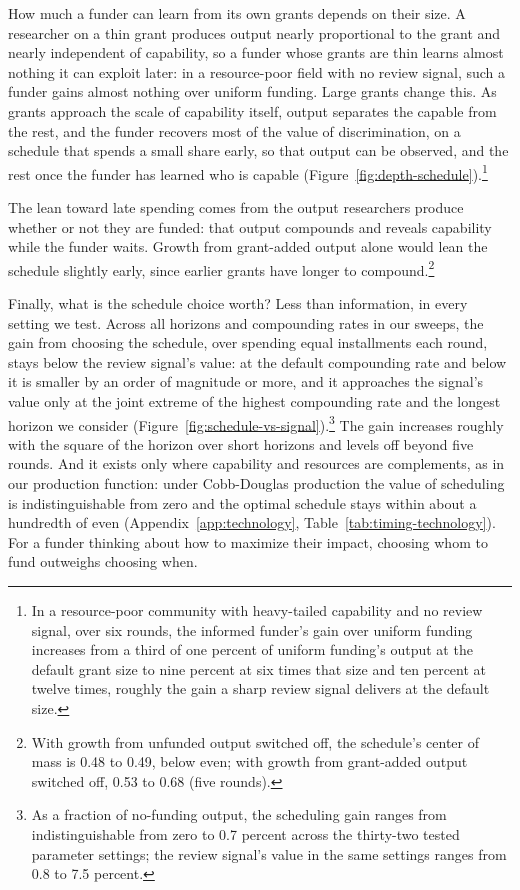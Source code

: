\documentclass[article, 11pt, reqno]{amsart}
\theoremstyle{named}
\begin{document}
How much a funder can learn from its own grants depends on their size. A researcher on a thin grant produces output nearly proportional to the grant and nearly independent of capability, so a funder whose grants are thin learns almost nothing it can exploit later: in a resource-poor field with no review signal, such a funder gains almost nothing over uniform funding. Large grants change this. As grants approach the scale of capability itself, output separates the capable from the rest, and the funder recovers most of the value of discrimination, on a schedule that spends a small share early, so that output can be observed, and the rest once the funder has learned who is capable (Figure~\ref{fig:depth-schedule}).\footnote{In a resource-poor community with heavy-tailed capability and no review signal, over six rounds, the informed funder's gain over uniform funding increases from a third of one percent of uniform funding's output at the default grant size to nine percent at six times that size and ten percent at twelve times, roughly the gain a sharp review signal delivers at the default size.}



The lean toward late spending comes from the output researchers produce whether or not they are funded: that output compounds and reveals capability while the funder waits. Growth from grant-added output alone would lean the schedule slightly early, since earlier grants have longer to compound.\footnote{With growth from unfunded output switched off, the schedule's center of mass is 0.48 to 0.49, below even; with growth from grant-added output switched off, 0.53 to 0.68 (five rounds).}

Finally, what is the schedule choice worth? Less than information, in every setting we test. Across all horizons and compounding rates in our sweeps, the gain from choosing the schedule, over spending equal installments each round, stays below the review signal's value: at the default compounding rate and below it is smaller by an order of magnitude or more, and it approaches the signal's value only at the joint extreme of the highest compounding rate and the longest horizon we consider (Figure~\ref{fig:schedule-vs-signal}).\footnote{As a fraction of no-funding output, the scheduling gain ranges from indistinguishable from zero to 0.7 percent across the thirty-two tested parameter settings; the review signal's value in the same settings ranges from 0.8 to 7.5 percent.} The gain increases roughly with the square of the horizon over short horizons and levels off beyond five rounds. And it exists only where capability and resources are complements, as in our production function: under Cobb-Douglas production the value of scheduling is indistinguishable from zero and the optimal schedule stays within about a hundredth of even (Appendix~\ref{app:technology}, Table~\ref{tab:timing-technology}). For a funder thinking about how to maximize their impact, choosing whom to fund outweighs choosing when.
\end{document}
